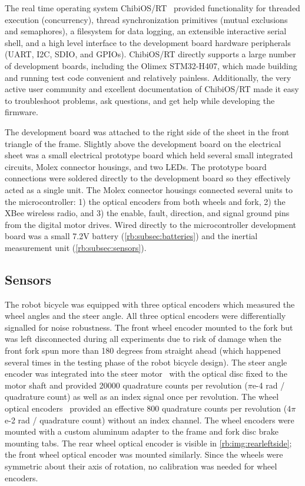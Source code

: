 The real time operating system ChibiOS/RT~\cite{ChibiOS} provided functionality
for threaded execution (concurrency), thread synchronization primitives (mutual
exclusions and semaphores), a filesystem for data logging, an extensible
interactive serial shell, and a high level interface to the development board
hardware peripherals (UART, I2C, SDIO, and GPIOs). ChibiOS/RT directly supports
a large number of development boards, including the Olimex STM32-H407, which
made building and running test code convenient and relatively painless.
Additionally, the very active user community and excellent documentation of
ChibiOS/RT made it easy to troubleshoot problems, ask questions, and get help
while developing the firmware.

The development board was attached to the right side of the sheet in the front
triangle of the frame. Slightly above the development board on the electrical
sheet was a small electrical prototype board which held several small
integrated circuits, Molex connector housings, and two LEDs. The prototype
board connections were soldered directly to the development board so they
effectively acted as a single unit. The Molex connector housings connected
several units to the microcontroller: 1) the optical encoders from both wheels
and fork, 2) the XBee wireless radio, and 3) the enable, fault, direction, and
signal ground pins from the digital motor drives. Wired directly to the
microcontroller development board was a small 7.2V battery
(\autoref{rb:subsec:batteries}) and the inertial measurement unit
(\autoref{rb:subsec:sensors}).


\subsection{Sensors} \label{rb:subsec:sensors}
The robot bicycle was equipped with three optical encoders which measured the
wheel angles and the steer angle. All three optical encoders were
differentially signalled for noise robustness. The front wheel encoder mounted
to the fork but was left disconnected during all experiments due to risk of
damage when the front fork spun more than 180 degrees from straight ahead
(which happened several times in the testing phase of the robot bicycle
design). The steer angle encoder was integrated into the steer
motor~\cite{TeknicM3441} with the optical disc fixed to the motor shaft and
provided 20000 quadrature counts per revolution ($\pi$e-4 rad / quadrature
count) as well as an index signal once per revolution. The wheel optical
encoders~\cite{USDigitalH5} provided an effective 800 quadrature counts per
revolution ($4\pi$e-2 rad / quadrature count) without an index channel. The
wheel encoders were mounted with a custom aluminum adapter to the frame and
fork disc brake mounting tabs. The rear wheel optical encoder is visible in
\autoref{rb:img:rearleftside}; the front wheel optical encoder was mounted
similarly. Since the wheels were symmetric about their axis of rotation, no
calibration was needed for wheel encoders.

